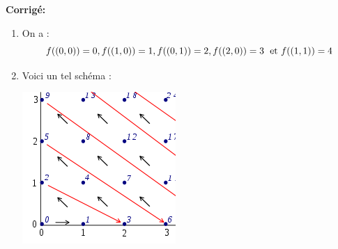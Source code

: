 \documentclass[a4paper,twoside,french,10pt]{VcCours}
\newcommand{\corr}{\textbf{Corrigé:}}
\begin{document}
\corr 
\begin{enumerate}
\item On a :
$$ f((0,0)) = 0,f((1,0))=1, f((0,1))= 2, f((2,0))=3 \; \hbox{ et } f((1,1))=4$$

\item Voici un tel schéma : 

\begin{center}
\includegraphics[scale=0.5]{den}
\end{center}


\end{enumerate}
\end{document}
